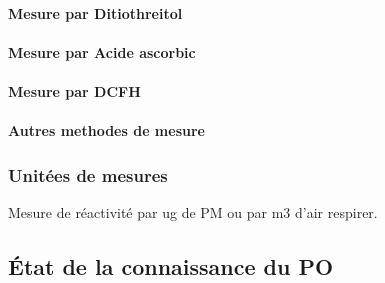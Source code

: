 \paragraph{Mesure par Ditiothreitol}%
\label{ssub:mesure_par_ditiothreitol}

\paragraph{Mesure par Acide ascorbic}%
\label{ssub:mesure_par_acide_ascorbic}

\paragraph{Mesure par DCFH}%
\label{ssub:mesure_par_dcfh}

\paragraph{Autres methodes de mesure}%
\label{sub:autres_methodes_de_mesure}

\subsubsection{Unitées de mesures}%
\label{ssub:unitees_de_mesures}

Mesure de réactivité par ug de PM ou par m3 d'air respirer.

\subsection{État de la connaissance du PO}%
\label{sub:etat_de_la_connaissance_du_po}



\printbibliography[segment=2,heading=subbibliography]
